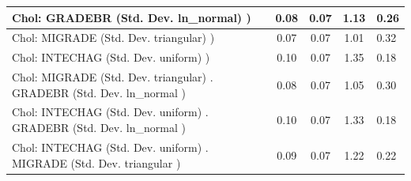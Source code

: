 \begin{table}
\begin{center}
\begin{tabular}{|l|l|c|c|c|l|}
			\hline
			 Chol: GRADEBR (Std. Dev. ln_normal) ) &  & 0.08 & 0.07 & 1.13 & 0.26 \\
			\hline
			 Chol: MIGRADE (Std. Dev. triangular) ) &  & 0.07 & 0.07 & 1.01 & 0.32 \\
			\hline
			 Chol: INTECHAG (Std. Dev. uniform) ) &  & 0.10 & 0.07 & 1.35 & 0.18 \\
			\hline
			 Chol: MIGRADE (Std. Dev. triangular) . GRADEBR (Std. Dev.   ln_normal ) &  & 0.08 & 0.07 & 1.05 & 0.30 \\
			\hline
			 Chol: INTECHAG (Std. Dev. uniform) . GRADEBR (Std. Dev.   ln_normal ) &  & 0.10 & 0.07 & 1.33 & 0.18 \\
			\hline
			 Chol: INTECHAG (Std. Dev. uniform) . MIGRADE (Std. Dev.   triangular ) &  & 0.09 & 0.07 & 1.22 & 0.22 \\
			\hline
		\end{tabular}
	\end{center}
\end{table}